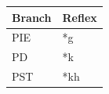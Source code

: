 \begin{table}[h]\centering
\begin{tabular}{ll} \toprule \textbf{Branch} & \textbf{Reflex} \\ \midrule
PIE & *g \\ 
PD & *k \\ 
PST & *kh \\ 
\bottomrule \end{tabular}\end{table}

